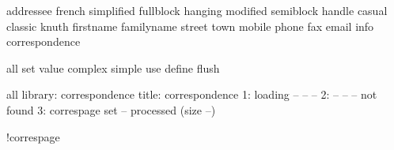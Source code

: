         {addressee}
            {french}
        {simplified}
         {fullblock}
           {hanging}
          {modified}
         {semiblock}
            {handle}
            {casual}
           {classic}
             {knuth}
         {firstname}
        {familyname}
            {street}
              {town}
            {mobile}
             {phone}
               {fax}
             {email}
              {info}
    {correspondence}
\stopinterface

\startinterface all
               {set}
             {value}
           {complex}
            {simple}
               {use}
            {define}
             {flush}
\stopinterface

%


\startmessages all library: correspondence
        title: correspondence
            1: loading -- -- --
            2: -- -- -- not found
            3: correspage set -- processed (size --)
\stopmessages


\def\????cn{@@@@cn}


\s!correspage


\newcount\correspageno
\newif\ifresettingcorrespagenumber

\def\newnofcorrespages{0}
\def\nofcorrespages   {0}

